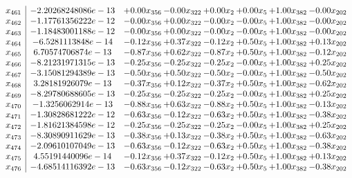 \documentclass[8pt]{article}
\begin{document}
\[\begin{array}{c| c c@{\hskip 2pt} c@{\hskip 2pt} c@{\hskip 2pt} c@{\hskip 2pt} c@{\hskip 2pt} c@{\hskip 2pt} }
 x_{461}   &  -2.20268248086e-13 & +  0.00 x_{356} & -0.00 x_{322} & +  0.00 x_{2} & +  0.00 x_{5} & +  1.00 x_{382} & -0.00 x_{202}\\
 x_{462}   &  -1.17761356222e-12 & -0.00 x_{356} & +  0.00 x_{322} & -0.00 x_{2} & -0.00 x_{5} & +  1.00 x_{382} & -0.00 x_{202}\\
 x_{463}   &  -1.18483001188e-12 & -0.00 x_{356} & +  0.00 x_{322} & -0.00 x_{2} & -0.00 x_{5} & +  1.00 x_{382} & -0.00 x_{202}\\
 x_{464}   &  -6.5281113848e-14 & -0.12 x_{356} & +  0.37 x_{322} & -0.12 x_{2} & +  0.50 x_{5} & +  1.00 x_{382} & +  0.13 x_{202}\\
 x_{465}   &  6.70574706874e-13 & -0.87 x_{356} & +  0.62 x_{322} & -0.87 x_{2} & +  0.50 x_{5} & +  1.00 x_{382} & -0.12 x_{202}\\
 x_{466}   &  -8.21231971315e-13 & -0.25 x_{356} & -0.25 x_{322} & -0.25 x_{2} & -0.00 x_{5} & +  1.00 x_{382} & +  0.25 x_{202}\\
 x_{467}   &  -3.15081294389e-13 & -0.50 x_{356} & +  0.50 x_{322} & -0.50 x_{2} & -0.00 x_{5} & +  1.00 x_{382} & -0.50 x_{202}\\
 x_{468}   &  3.28181926079e-13 & -0.37 x_{356} & +  0.12 x_{322} & -0.37 x_{2} & +  0.50 x_{5} & +  1.00 x_{382} & -0.62 x_{202}\\
 x_{469}   &  -8.29780688605e-13 & -0.25 x_{356} & -0.25 x_{322} & -0.25 x_{2} & -0.00 x_{5} & +  1.00 x_{382} & +  0.25 x_{202}\\
 x_{470}   &  -1.3256062914e-13 & -0.88 x_{356} & +  0.63 x_{322} & -0.88 x_{2} & +  0.50 x_{5} & +  1.00 x_{382} & -0.13 x_{202}\\
 x_{471}   &  -1.30828681222e-12 & -0.63 x_{356} & -0.12 x_{322} & -0.63 x_{2} & +  0.50 x_{5} & +  1.00 x_{382} & -0.38 x_{202}\\
 x_{472}   &  -1.81621384598e-12 & -0.25 x_{356} & -0.25 x_{322} & -0.25 x_{2} & -0.00 x_{5} & +  1.00 x_{382} & +  0.25 x_{202}\\
 x_{473}   &  -8.30890911629e-13 & -0.38 x_{356} & +  0.13 x_{322} & -0.38 x_{2} & +  0.50 x_{5} & +  1.00 x_{382} & -0.63 x_{202}\\
 x_{474}   &  -2.09610107049e-13 & -0.63 x_{356} & -0.12 x_{322} & -0.63 x_{2} & +  0.50 x_{5} & +  1.00 x_{382} & -0.38 x_{202}\\
 x_{475}   &  4.55191440096e-14 & -0.12 x_{356} & +  0.37 x_{322} & -0.12 x_{2} & +  0.50 x_{5} & +  1.00 x_{382} & +  0.13 x_{202}\\
 x_{476}   &  -4.68514116392e-13 & -0.63 x_{356} & -0.12 x_{322} & -0.63 x_{2} & +  0.50 x_{5} & +  1.00 x_{382} & -0.38 x_{202}\\

\end{array}\]
\end{document}
